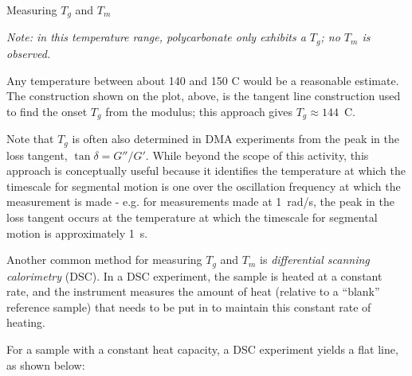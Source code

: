 \begin{activity}{Measuring $T_g$ and $T_m$}
\begin{ctqs}
		\emph{Note: in this temperature range, polycarbonate only exhibits a $T_g$; no $T_m$ is observed.}
		
		\begin{solution}[1in]
			Any temperature between about 140 and 150 C would be a reasonable estimate.  The construction shown on the plot, above, is the tangent line construction used to find the onset $T_g$ from the modulus; this approach gives $T_g \approx 144$~C.
			
			Note that $T_g$ is often also determined in DMA experiments from the peak in the loss tangent, $\tan\delta = G''/G'$. While beyond the scope of this activity, this approach is conceptually useful because it identifies the temperature at which the timescale for segmental motion is one over the oscillation frequency at which the measurement is made - e.g. for measurements made at 1~rad/s, the peak in the loss tangent occurs at the temperature at which the timescale for segmental motion is approximately 1~s.
		\end{solution}
	
\end{ctqs}

	
	



\begin{model}
	
	Another common method for measuring $T_g$ and $T_m$ is \emph{differential scanning calorimetry} (DSC).  In a DSC experiment, the sample is heated at a constant rate, and the instrument measures the amount of heat (relative to a ``blank'' reference sample) that needs to be put in to maintain this constant rate of heating.
	
	For a sample with a constant heat capacity, a DSC experiment yields a flat line, as shown below:
	

\end{model}
\end{activity}
